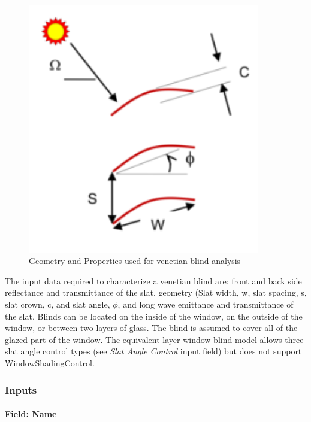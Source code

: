 \begin{figure}[hbtp] %
\centering
\includegraphics[width=0.9\textwidth, height=0.9\textheight, keepaspectratio=true]{media/image047.png}
\caption{Geometry and Properties used for venetian blind analysis \protect \label{fig:geometry-and-properties-used-for-venetian}}
\end{figure}

The input data required to characterize a venetian blind are: front and back side reflectance and transmittance of the slat, geometry (Slat width, w, slat spacing, s, slat crown, c, and slat angle, $\phi$, and long wave emittance and transmittance of the slat. Blinds can be located on the inside of the window, on the outside of the window, or between two layers of glass. The blind is assumed to cover all of the glazed part of the window.
The equivalent layer window blind model allows three slat angle control types (see \textit{Slat Angle Control} input field) but does not support WindowShadingControl.

\subsubsection{Inputs}\label{inputs-28-001}

\paragraph{Field: Name}\label{field-name-22-003}


